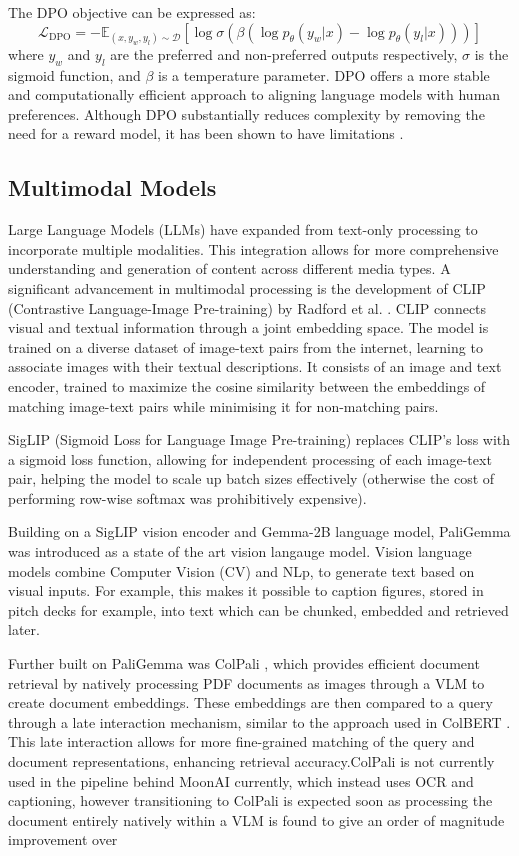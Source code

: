 \documentclass[a4paper, oneside]{discothesis}
\begin{document}
The DPO objective can be expressed as:
\[\mathcal{L}_{\text{DPO}} = -\mathbb{E}_{(x,y_w,y_l)\sim \mathcal{D}}[\log \sigma(\beta(\log p_\theta(y_w|x) - \log p_\theta(y_l|x)))]\]
where $y_w$ and $y_l$ are the preferred and non-preferred outputs respectively, $\sigma$ is the sigmoid function, and $\beta$ is a temperature parameter. DPO offers a more stable and computationally efficient approach to aligning language models with human preferences. Although DPO substantially reduces complexity by removing the need for a reward model, it has been shown to have limitations \cite{xu2024dposuperiorppollm}.


\subsection{Multimodal Models}
Large Language Models (LLMs) have expanded from text-only processing to incorporate multiple modalities. This integration allows for more comprehensive understanding and generation of content across different media types. A significant advancement in multimodal processing is the development of CLIP (Contrastive Language-Image Pre-training) by Radford et al. \cite{radford2021cliplearning}. CLIP connects visual and textual information through a joint embedding space. The model is trained on a diverse dataset of image-text pairs from the internet, learning to associate images with their textual descriptions. It consists of an image and text encoder, trained to maximize the cosine similarity between the embeddings of matching image-text pairs while minimising it for non-matching pairs.

SigLIP (Sigmoid Loss for Language Image Pre-training) \cite{zhai2023sigmoidlosslanguageimage} replaces CLIP's loss with a sigmoid loss function, allowing for independent processing of each image-text pair, helping the model to scale up batch sizes effectively (otherwise the cost of performing row-wise softmax was prohibitively expensive). 

Building on a SigLIP vision encoder and Gemma-2B language model, PaliGemma was introduced as a state of the art vision langauge model. \cite{gemma2024pali} 
Vision language models combine Computer Vision (CV) and NLp, to generate text based on visual inputs. For example, this makes it possible to caption figures, stored in pitch decks for example, into text which can be chunked, embedded and retrieved later.

Further built on PaliGemma was ColPali \cite{faysse_sibille_2024colpali}, which provides efficient document retrieval by natively processing PDF documents as images through a VLM to create document embeddings. These embeddings are then compared to a query through a late interaction mechanism, similar to the approach used in ColBERT \cite{khattab2020colbert}. This late interaction allows for more fine-grained matching of the query and document representations, enhancing retrieval accuracy.ColPali is not currently used in the pipeline behind MoonAI currently, which instead uses OCR and captioning, however transitioning to ColPali is expected soon as processing the document entirely natively within a VLM is found to give an order of magnitude improvement over 
\end{document}
